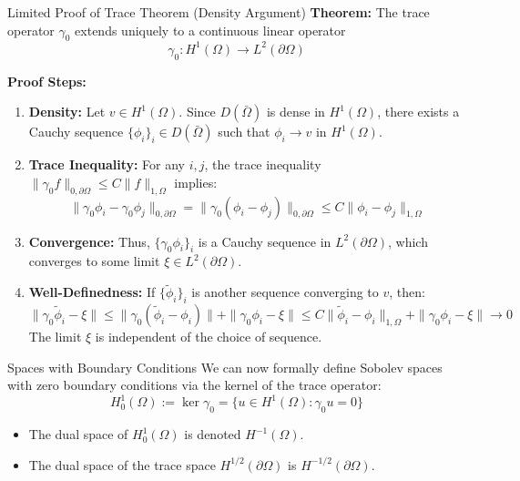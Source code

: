 \documentclass[aspectratio=169]{beamer}
\begin{document}
\begin{frame}{Limited Proof of Trace Theorem (Density Argument)}
    \textbf{Theorem:} The trace operator $\gamma_0$ extends uniquely to a continuous linear operator 
    $$\gamma_0: H^1(\Omega) \to L^2(\partial\Omega)$$

    \vspace{0.2cm}
    \textbf{Proof Steps:}
    \begin{enumerate}
        \item<1-> \textbf{Density:} Let $v \in H^1(\Omega)$. Since $D(\bar{\Omega})$ is dense in $H^1(\Omega)$, there exists a Cauchy sequence $\{\phi_i\}_{i} \in D(\bar{\Omega})$ such that $\phi_i \to v$ in $H^1(\Omega)$.
        \item<2-> \textbf{Trace Inequality:} For any $i, j$, the trace inequality $\|\gamma_0 f\|_{0,\partial\Omega} \le C\|f\|_{1,\Omega}$  implies:
        \[ \|\gamma_0\phi_i - \gamma_0\phi_j\|_{0,\partial\Omega} = \|\gamma_0(\phi_i - \phi_j)\|_{0,\partial\Omega} \le C\|\phi_i - \phi_j\|_{1,\Omega} \]
        \item<3-> \textbf{Convergence:} Thus, $\{\gamma_0\phi_i\}_{i}$ is a Cauchy sequence in $L^2(\partial\Omega)$, which converges to some limit $\xi \in L^2(\partial\Omega)$.
        \item<4-> \textbf{Well-Definedness:} If $\{\tilde{\phi}_i\}_{i}$ is another sequence converging to $v$, then:
        \[ \|\gamma_0\tilde{\phi}_i - \xi\| \le \|\gamma_0(\tilde{\phi}_i - \phi_i)\| + \|\gamma_0\phi_i - \xi\| \le C\|\tilde{\phi}_i - \phi_i\|_{1,\Omega} + \|\gamma_0\phi_i - \xi\| \to 0 \]
        The limit $\xi$ is independent of the choice of sequence.
    \end{enumerate}
\end{frame}

\begin{frame}{Spaces with Boundary Conditions}
    We can now formally define Sobolev spaces with zero boundary conditions via the kernel of the trace operator:
    \[
        H^1_0(\Omega) := \ker \gamma_0 = \{ u \in H^1(\Omega) : \gamma_0 u = 0 \} \text{}
    \]
    \begin{itemize}
        \item The dual space of $H^1_0(\Omega)$ is denoted $H^{-1}(\Omega)$.
        \item The dual space of the trace space $H^{1/2}(\partial\Omega)$ is $H^{-1/2}(\partial\Omega)$.
    \end{itemize}

    \vspace{0.3cm}
\end{frame}
\end{document}
